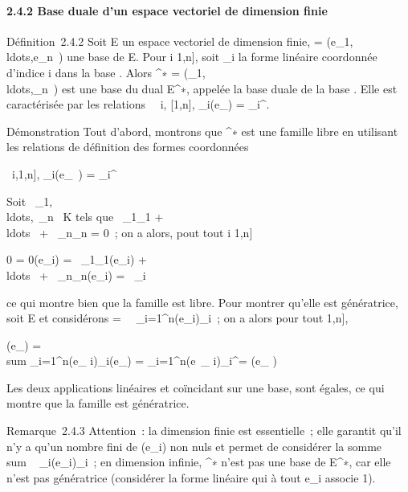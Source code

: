 \documentclass[]{article}
\begin{document}
\paragraph{2.4.2 Base duale d'un espace vectoriel de dimension finie}

Définition~2.4.2 Soit E un espace vectoriel de dimension finie,  =
(e\_1,\\ldots,e\_n~)
une base de E. Pour i \in {[}1,n{]}, soit \phi\_i la forme linéaire
coordonnée d'indice i dans la base . Alors ^∗ =
(\phi\_1,\\ldots,\phi\_n~)
est une base du dual E^∗, appelée la base duale de la base .
Elle est caractérisée par les relations \forall~~i,\jmath \in
{[}1,n{]}, \phi\_i(e\_\jmath) = \delta\_i^\jmath.

Démonstration Tout d'abord, montrons que ^∗ est une famille
libre en utilisant les relations de définition des formes coordonnées

\forall~i,\jmath \in {[}1,n{]}, \phi\_i(e\_\jmath~) =
\delta\_i^\jmath

Soit
\lambda~\_1,\\ldots,\lambda~\_n~
\in K tels que \lambda~\_1\phi\_1 +
\\ldots~ +
\lambda~\_n\phi\_n = 0~; on a alors, pout tout i \in {[}1,n{]}

0 = 0(e\_i) = \lambda~\_1\phi\_1(e\_i) +
\\ldots~ +
\lambda~\_n\phi\_n(e\_i) = \lambda~\_i

ce qui montre bien que la famille est libre. Pour montrer qu'elle est
génératrice, soit \phi \in E et considérons \psi =\
\sum ~
\_i=1^n\phi(e\_i)\phi\_i~; on a alors pour tout \jmath
\in {[}1,n{]},

\psi(e\_\jmath) = \\sum
\_i=1^n\phi(e\_ i)\phi\_i(e\_\jmath) =
\sum \_i=1^n\phi(e~\_
i)\delta\_i^\jmath = \phi(e\_ \jmath)

Les deux applications linéaires \phi et \psi coïncidant sur une base, sont
égales, ce qui montre que la famille est génératrice.

Remarque~2.4.3 Attention~: la dimension finie est essentielle~; elle
garantit qu'il n'y a qu'un nombre fini de \phi(e\_i) non nuls et
permet de considérer la somme
\\sum ~
\_i\inI\phi(e\_i)\phi\_i~; en dimension infinie,
^∗ n'est pas une base de E^∗, car elle n'est pas
génératrice (considérer la forme linéaire \phi qui à tout e\_i
associe 1).
\end{document}
